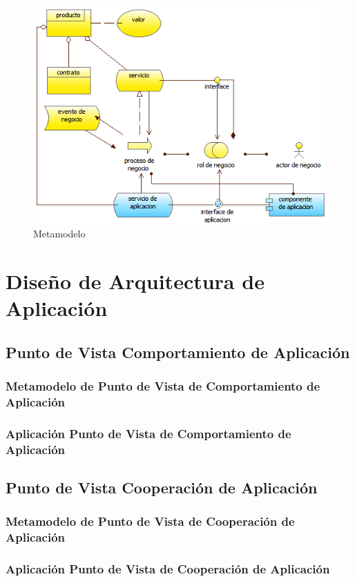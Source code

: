       \begin{figure}[h]
      	\centering
      	\includegraphics{Imagenes/Metamodelos/06.png}
      	\caption{Metamodelo}
      	\label{metamodelo6}
      \end{figure}
     \section{Diseño de Arquitectura de Aplicación}
      \subsection{Punto de Vista Comportamiento de Aplicación}
      \subsubsection{Metamodelo de Punto de Vista de Comportamiento de Aplicación}
      \subsubsection{Aplicación Punto de Vista de Comportamiento de Aplicación}
      \subsection{Punto de Vista Cooperación de Aplicación}
      \subsubsection{Metamodelo de Punto de Vista de Cooperación de Aplicación}
      \subsubsection{Aplicación Punto de Vista de Cooperación de Aplicación}
